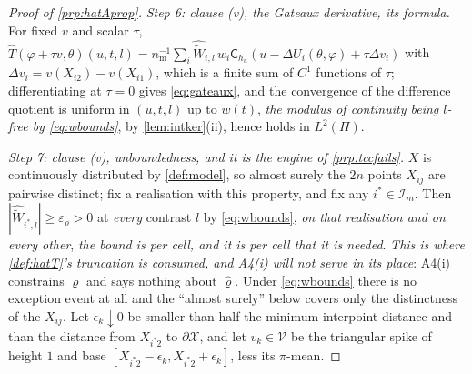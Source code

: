 \begin{proof}[Proof of \cref{prp:hatAprop}]
\emph{Step 6: clause (v), the Gateaux derivative, its formula.} For fixed $v$ and scalar $\tau$,
$\hat T(\varphi+\tau v,\theta)(u,t,l)=n_{\mathrm m}^{-1}\sum_i\widehat{\widetilde W}_{i,l}\,w_i
\mathsf C_{h_u}(u-\Delta U_i(\theta,\varphi)+\tau\Delta v_i)$ with $\Delta v_i=v(X_{i2})-v(X_{i1})$,
which is a finite sum of $C^1$ functions of $\tau$; differentiating at $\tau=0$ gives
\eqref{eq:gateaux}, and the convergence of the difference quotient is uniform in $(u,t,l)$ up to
$\bar w(t)$, \emph{the modulus of continuity being $l$-free by \eqref{eq:wbounds}}, by
\cref{lem:intker}(ii), hence holds in $L^{2}(\Pi)$.

\emph{Step 7: clause (v), unboundedness, and it is the engine of \cref{prp:tccfails}.}
$X$ is continuously distributed by \cref{def:model}, so almost surely the $2n$ points $X_{ij}$ are
pairwise distinct; fix a realisation with this property, and fix any $i^\ast\in\mathcal I_m$. Then
$|\widehat{\widetilde W}_{i^\ast,l}|\ge\varepsilon_\varrho>0$ at \emph{every} contrast $l$ by
\eqref{eq:wbounds}, \emph{on that
realisation and on every other}, \emph{the bound is per cell, and it is per cell that it is needed}. \emph{This is where \cref{def:hatT}'s truncation is consumed, and
A4(i) will not serve in its place}: A4(i) constrains $\varrho$ and says nothing about $\hat\varrho$.
Under \eqref{eq:wbounds} there is no exception
event at all and the ``almost surely'' below covers only the distinctness of the $X_{ij}$. Let
$\epsilon_k\downarrow0$ be smaller than half the minimum interpoint distance and than the distance from
$X_{i^\ast2}$ to $\partial\mathcal X$, and let $v_k\in\mathcal V$ be the triangular spike of height $1$
and base $[X_{i^\ast2}-\epsilon_k,X_{i^\ast2}+\epsilon_k]$, less its $\pi$-mean.

\end{proof}
